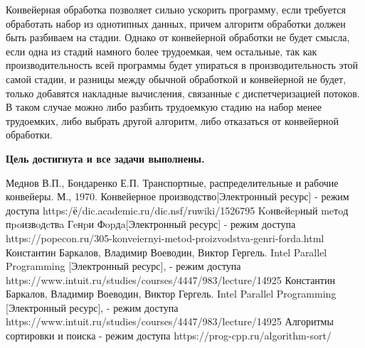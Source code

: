\documentclass[12pt]{report}
\begin{document}
Конвейерная обработка позволяет сильно ускорить программу, если требуется обработать набор из однотипных данных, причем алгоритм обработки должен быть разбиваем на стадии. Однако от конвейерной обработки не будет смысла, если одна из стадий намного более трудоемкая, чем остальные, так как производительность всей программы будет упираться в производительность этой самой стадии, и разницы между обычной обработкой и конвейерной не будет, только добавятся накладные вычисления, связанные с диспетчеризацией потоков. В таком случае можно либо разбить трудоемкую стадию на набор менее трудоемких, либо выбрать другой алгоритм, либо отказаться от конвейерной обработки.

\begin{center}
\textbf{Цель достигнута и все задачи выполнены.}
\end{center}

\begin{thebibliography}{3}
	 Меднов В.П., Бондаренко Е.П. Транспортные, распределительные и рабочие конвейеры. М., 1970.
	 Конвейерное производство[Электронный ресурс] - режим доступа https:/ё/dic.academic.ru/dic.nsf/ruwiki/1526795
	 Koнвeйepный meтoд пpoизвoдcтвa Гeнpи Фopдa[Электронный ресурс] - режим доступа https://popecon.ru/305-konveiernyi-metod-proizvodstva-genri-forda.html
	 Константин Баркалов, Владимир Воеводин, Виктор Гергель. Intel Parallel Programming [Электронный ресурс], - режим доступа https://www.intuit.ru/studies/courses/4447/983/lecture/14925
	Константин Баркалов, Владимир Воеводин, Виктор Гергель. Intel Parallel Programming [Электронный ресурс], - режим доступа https://www.intuit.ru/studies/courses/4447/983/lecture/14925
	 Алгоритмы сортировки и поиска - режим доступа https://prog-cpp.ru/algorithm-sort/
\end{thebibliography}
\end{document}
